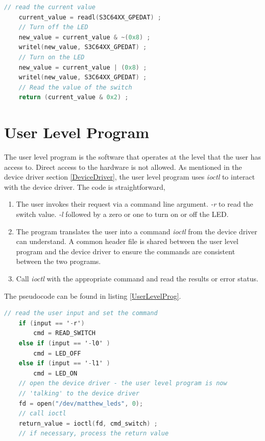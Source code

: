 \documentclass[12pt,conference]{IEEEtran}
\begin{document}
\begin{lstlisting}[language=C, frame=single, caption=Pseudo Code to read and write GPEDAT,label=ReadGPEDATCode]
	// read the current value
	current_value = readl(S3C64XX_GPEDAT) ;
	// Turn off the LED
	new_value = current_value & ~(0x8) ;
	writel(new_value, S3C64XX_GPEDAT) ;
	// Turn on the LED
	new_value = current_value | (0x8) ;
	writel(new_value, S3C64XX_GPEDAT) ;
	// Read the value of the switch
	return (current_value & 0x2) ;
\end{lstlisting}

\section{User Level Program}
The user level program is the software that operates at the level that the user has access to.  Direct access to the hardware is not allowed. As mentioned in the device driver section \ref{DeviceDriver}, the user level program uses \emph{ioctl} to interact with the device driver. The code is straightforward,
\begin{enumerate}
	\item The user invokes their request via a command line argument.  \emph{-r} to read the switch value. \emph{-l} followed by a zero or one to turn on or off the LED.
	\item The program translates the user into a command \emph{ioctl} from the device driver can understand. A common header file is shared between the user level program and the device driver to ensure the commands are consistent between the two programs.
	\item Call \emph{ioctl} with the appropriate command and read the results or error status.
\end{enumerate}
The pseudocode can be found in listing \ref{UserLevelProg}.

\begin{lstlisting}[language=C, frame=single, caption=User Level Pseudo Code,label=UserLevelProg]
	// read the user input and set the command
	if (input == '-r')
		cmd = READ_SWITCH
	else if (input == '-l0' )
		cmd = LED_OFF
	else if (input == '-l1' )
		cmd = LED_ON
	// open the device driver - the user level program is now
	// 'talking' to the device driver
	fd = open("/dev/matthew_leds", 0);
	// call ioctl
	return_value = ioctl(fd, cmd_switch) ;
	// if necessary, process the return value
\end{lstlisting}
\end{document}
